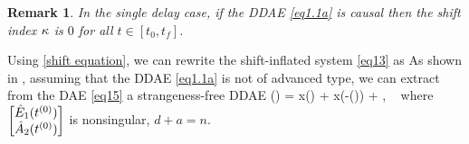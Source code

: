 \documentclass[final,reqno]{siamltex}
\newtheorem{remark}[theorem]{Remark}
\begin{document}
\begin{remark}
In the single delay case, if the DDAE \eqref{eq1.1a} is causal then the shift index $\kappa$ is $0$ for all $t \in [t_0,t_f]$.
\end{remark}

Using \eqref{shift equation}, we can rewrite the shift-inflated system \eqref{eq13} as
%
\be\label{eq15}
\ee
%
As shown in \cite{HaM14}, assuming that the DDAE \eqref{eq1.1a} is not of advanced type, we can extract from the DAE \eqref{eq15} a strangeness-free DDAE 
%
\be\label{eq16}
  () \!=\!  x() \!+\!
  x(-\tau()) \!+\! , \ 
\ee
%
where $\begin{bmatrix} \hat{E}_{1}(t^{(0)}) \\ \hat{A}_{2}(t^{(0)}) \end{bmatrix}$ is nonsingular, $d+a=n$.\\
\end{document}
